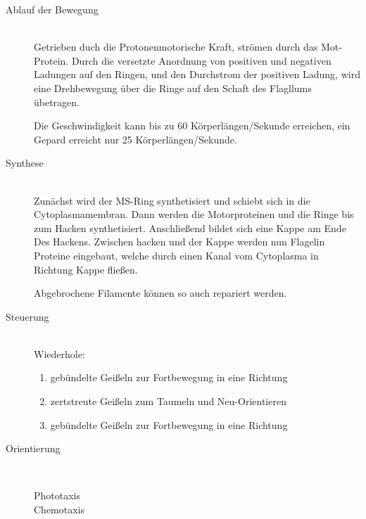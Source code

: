 \begin{description}
	\item[Ablauf der Bewegung] \hfill \\
		Getrieben duch die Protonenmotorische Kraft,
		strömen  durch das Mot-Protein.
		Durch die versetzte Anordnung von positiven und negativen Ladungen auf den Ringen,
		und den Durchstrom der positiven Ladung,
		wird eine Drehbewegung über die Ringe auf den Schaft des Flagllums übetragen.

		Die Geschwindigkeit kann bis zu 60 Körperlängen/Sekunde erreichen,
		ein Gepard erreicht nur 25 Körperlängen/Sekunde.

	\item[Synthese] \hfill \\
		Zunächst wird der MS-Ring synthetisiert und schiebt sich in die Cytoplasmamembran.
		Dann werden die Motorproteinen und die Ringe bis zum Hacken synthetisiert.
		Anschließend bildet sich eine Kappe am Ende Des Hackens.
		Zwischen hacken und der Kappe werden nun Flagelin Proteine eingebaut,
		welche durch einen Kanal vom Cytoplasma in Richtung Kappe fließen.

		Abgebrochene Filamente können so auch repariert werden.

	\item[Steuerung] \hfill \\
		Wiederhole:
		\begin{enumerate}
			\item gebündelte Geißeln zur Fortbewegung in eine Richtung
			\item zertstreute Geißeln zum Taumeln und Neu-Orientieren
			\item gebündelte Geißeln zur Fortbewegung in eine Richtung
		\end{enumerate}

	\item[Orientierung] \hfill \\
		\begin{description}
			\item[Phototaxis]
			\item[Chemotaxis]
		\end{description}

\end{description}

